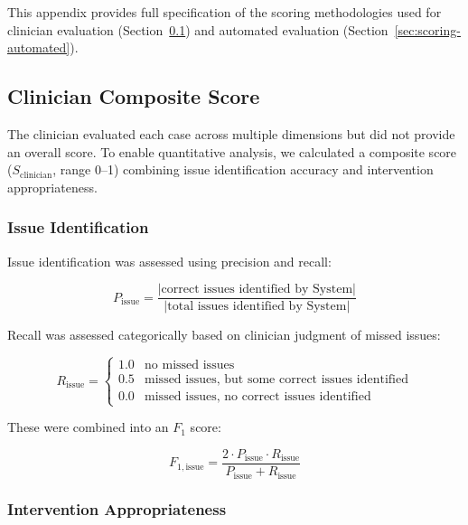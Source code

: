 \label{app:scoring}

This appendix provides full specification of the scoring methodologies used for clinician evaluation (Section~\ref{sec:scoring-clinician}) and automated evaluation (Section~\ref{sec:scoring-automated}).

\subsection{Clinician Composite Score}
\label{sec:scoring-clinician}

The clinician evaluated each case across multiple dimensions but did not provide an overall score. To enable quantitative analysis, we calculated a composite score ($S_{\text{clinician}}$, range 0--1) combining issue identification accuracy and intervention appropriateness.

\subsubsection{Issue Identification}

Issue identification was assessed using precision and recall:

\begin{equation}
    P_{\text{issue}} = \frac{|\text{correct issues identified by System}|}{|\text{total issues identified by System}|}
\end{equation}

Recall was assessed categorically based on clinician judgment of missed issues:

\begin{equation}
    R_{\text{issue}} = \begin{cases}
        1.0 & \text{no missed issues} \\
        0.5 & \text{missed issues, but some correct issues identified} \\
        0.0 & \text{missed issues, no correct issues identified}
    \end{cases}
\end{equation}

These were combined into an $F_1$ score:

\begin{equation}
    F_{1,\text{issue}} = \frac{2 \cdot P_{\text{issue}} \cdot R_{\text{issue}}}{P_{\text{issue}} + R_{\text{issue}}}
\end{equation}

\subsubsection{Intervention Appropriateness}

